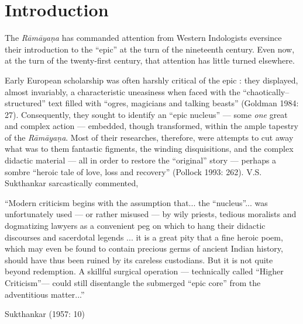 \chapter*{Introduction}


The {\sl Rāmāyaṇa} has commanded attention from Western Indologists eversince their introduction to the “epic” at the turn of the nineteenth century. Even now, at the turn of the twenty-first century, that attention has little turned elsewhere.  

Early European scholarship was often harshly critical of the epic : they displayed, almost invariably, a characteristic uneasiness when faced with the “chaotically–structured” text filled with “ogres, magicians and talking beasts” (Goldman 1984: 27). Consequently, they sought to identify an “epic nucleus” --- some {\sl one} great and complex action --- embedded, though transformed, within the ample tapestry of the {\sl Rāmāyaṇa}. Most of their researches, therefore, were attempts to cut away what was to them fantastic figments, the winding disquisitions, and the complex didactic material --- all in order to restore the “original” story --- perhaps a sombre “heroic tale of love, loss and recovery” (Pollock 1993: 262). V.S. Sukthankar sarcastically commented,  

\begin{myquote}
“Modern criticism begins with the assumption that... the “nucleus”... was unfortunately used --- or rather misused --- by wily priests, tedious moralists and dogmatizing lawyers as a convenient peg on which to hang their didactic discourses and sacerdotal legends ... it is a great pity that a fine heroic poem, which may even be found to contain precious germs of ancient Indian history, should have thus been ruined by its careless custodians. But it is not quite beyond redemption. A skillful surgical operation --- technically called “Higher Criticism”— could still disentangle the submerged “epic core” from the adventitious matter...”

\hfill Sukthankar (1957: 10)
\end{myquote}

